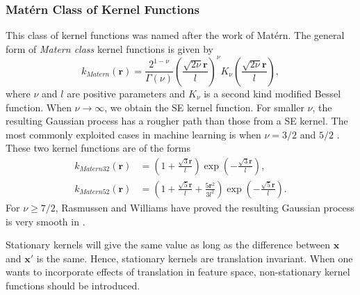 \documentclass[11pt,a4paper]{article}
\theoremstyle{definition}
\numberwithin{equation}{section}
\let\vec\mathbf
\begin{document}
	\subsubsection*{Mat\'ern Class of Kernel Functions}
	This class of kernel functions was named after the work of Mat\'ern. The general form of \textit{Matern class} kernel functions is given by
	\begin{equation}
	k_{Matern}(\vec r) = \frac{2^{1-\nu}}{\Gamma{(\nu)}}\left(\frac{\sqrt{2\nu}\vec r}{l}\right)^\nu K_\nu \left(\frac{\sqrt{2\nu}\vec r}{l}\right),
	\end{equation}
	where $\nu$ and $l$ are positive parameters and $K_\nu$ is a second kind modified Bessel function\cite[sec 9.6]{Ab_St}. When $\nu \rightarrow \infty$, we obtain the SE kernel function. For smaller $\nu$, the resulting Gaussian process has a rougher path than those from a SE kernel. The most commonly exploited cases in machine learning is when $\nu = 3/2$ and $ 5/2$ \cite[sec 4.2]{RandW}. These two kernel functions are of the forms
	\begin{equation}
	\begin{split}
	k_{Matern32}(\vec r) &=\left(1+\frac{\sqrt{3}\vec r}{l}\right)\exp\left(-\frac{\sqrt{3}\vec r}{l}\right),\\
	k_{Matern52}(\vec r) &=\left(1+\frac{\sqrt{5}\vec r}{l}+\frac{5\vec r^2}{3l^2}\right)\exp\left(-\frac{\sqrt{5}\vec r}{l}\right).
	\end{split}
	\end{equation}
	For $\nu\geq 7/2$, Rasmussen and Williams have proved the resulting Gaussian process is very smooth in \cite[sec 4.2]{RandW}.
	
	Stationary kernels will give the same value as long as the difference between $\vec x$ and $\vec x'$ is the same. Hence, stationary kernels are translation invariant. When one wants to incorporate effects of translation in feature space, non-stationary kernel functions should be introduced.
	
\end{document}

